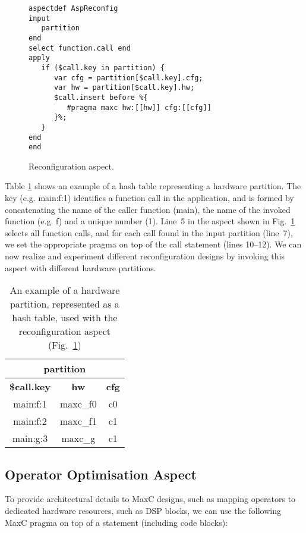 \lstset{style=lara}
\begin{figure}[!h]
\begin{lstlisting}
aspectdef AspReconfig
input
   partition
end
select function.call end
apply
   if ($call.key in partition) {
      var cfg = partition[$call.key].cfg;
      var hw = partition[$call.key].hw;
      $call.insert before %{
         #pragma maxc hw:[[hw]] cfg:[[cfg]]
      }%;
   }
end
end
\end{lstlisting}
\caption{Reconfiguration aspect.}
\label{fig:aspect-reconf}
\end{figure}

Table \ref{fig:aspect-hash} shows an example of a hash table representing
a hardware partition. The key (e.g. main:f:1) identifies a function call in the application, and is
formed by concatenating the name of the caller function (main), the name of the invoked function (e.g. f) and a
unique number (1).  Line~5 in the aspect shown in Fig.~\ref{fig:aspect-reconf} selects all function calls,
and for each call found in the input partition (line~7), we set the
appropriate pragma on top of the call statement (lines 10--12). We can now realize and experiment
different reconfiguration designs by invoking this aspect with different hardware partitions.


\begin{table}[!h]
\caption{An example of a hardware partition, represented as a hash table, used with the reconfiguration aspect (Fig.~\ref{fig:aspect-reconf})}
\label{fig:aspect-hash}
\centering
\begin{tabular}{c|c|c}
\hline
\multicolumn{3}{c}{\bf{partition}} \\
\hline
\bf{\$call.key} & \bf{hw} & \bf{cfg}  \\
\hline
main:f:1 & maxc\_f0 & c0 \\
main:f:2 & maxc\_f1 & c1 \\
main:g:3 & maxc\_g & c1 \\
\hline
\end{tabular}
\end{table}

\subsection{Operator Optimisation Aspect}
\label{sect:asp_ops}
To provide architectural details to MaxC designs, such as mapping operators to dedicated hardware resources, 
such as DSP blocks, we can use the following MaxC pragma on top of a statement (including code blocks):

